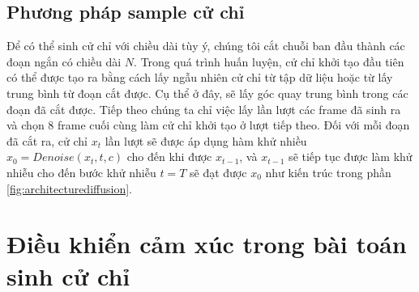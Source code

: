 \subsection{Phương pháp sample cử chỉ}

Để có thể sinh cử chỉ với chiều dài tùy ý, chúng tôi cắt chuỗi ban đầu thành các đoạn ngắn có chiều dài $N$. Trong quá trình huấn luyện, cử chỉ khởi tạo đầu tiên có thể được tạo ra bằng cách lấy ngẫu nhiên cử chỉ từ tập dữ liệu hoặc từ lấy trung bình từ đoạn cắt được. Cụ thể ở đây, sẽ lấy góc quay trung bình trong các đoạn đã cắt được. Tiếp theo chúng ta chỉ việc lấy lần lượt các frame đã sinh ra và chọn $8$ frame cuối cùng làm cử chỉ khởi tạo ở lượt tiếp theo. Đối với mỗi đoạn đã cắt ra, cử chỉ $x_{t}$ lần lượt sẽ được áp dụng hàm khử nhiều $\hat{x}_{0} = Denoise \left(x_{t}, t, c\right)$ cho đến khi được  $x_{t-1}$, và $x_{t-1}$ sẽ tiếp tục được làm khử nhiễu cho đến bước khử nhiễu $t=T$ sẽ đạt được $x_{0}$ như kiến trúc trong phần \autoref{fig:architecturediffusion}.



\section{Điều khiển cảm xúc trong bài toán sinh cử chỉ}

